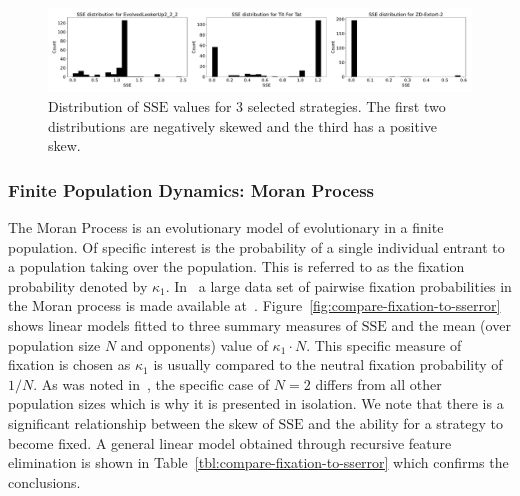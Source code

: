 \documentclass[a4paper]{article}
\newcommand{\SSe}{\text{SSE}}
\begin{document}
\begin{figure}[!hbtp]
    \centering
    \includegraphics[width=\textwidth]{./assets/img/sserror_distribution_for_selection_of_strategies/main.pdf}
    \caption{Distribution of \(\SSe\) values for 3 selected strategies. The
    first two distributions are negatively skewed and the third has a positive
    skew.}
    \label{fig:sserror_distribution_for_selection_of_strategies}
\end{figure}

\subsubsection{Finite Population Dynamics: Moran Process}

The Moran Process is an evolutionary model of evolutionary in a finite
population. Of specific interest is the probability of a single 
individual entrant to a population taking over the population.
This is referred to as the fixation probability denoted by \(\kappa_1\).
In~\cite{Moran1707} a large data set of pairwise fixation probabilities in the
Moran process is made available at~\cite{vincent_knight_2017_1040129}.
Figure~\ref{fig:compare-fixation-to-sserror} shows linear models fitted to three
summary measures of \(\SSe\) and the mean (over population size \(N\) and
opponents) value of \(\kappa_1\cdot N\). This
specific measure of fixation is chosen as \(\kappa_1\) is usually compared to
the neutral fixation probability of \(1 / N\).  As was noted
in~\cite{Moran1707}, the specific case of \(N=2\) differs from all other
population sizes which is why it is presented in isolation.  We note that there
is a significant relationship between the skew of \(\SSe\) and the ability for a
strategy to become fixed.  A general linear model obtained through recursive
feature elimination is shown in Table~\ref{tbl:compare-fixation-to-sserror}
which confirms the conclusions.
\end{document}

